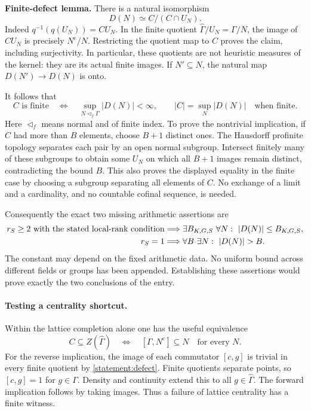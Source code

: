 \documentclass[11pt,a4paper]{article}
\numberwithin{equation}{section}
\begin{document}
\textbf{Finite-defect lemma.} There is a natural isomorphism
\begin{equation}\label{statement:defect}
 D(N)\simeq C/(C\cap U_N).
\end{equation}
Indeed $q^{-1}(q(U_N))=CU_N$.  In the finite quotient
$\widehat\Gamma/U_N=\Gamma/N$, the image of $CU_N$ is precisely
$N^{\mathrm c}/N$.  Restricting the quotient map to $C$ proves the
claim, including surjectivity.  In particular, these quotients are not
heuristic measures of the kernel: they are its actual finite images.
If $N'\subseteq N$, the natural map $D(N')\to D(N)$ is onto.

It follows that
\begin{equation}\label{statement:equivalence}
 C\text{ is finite}\quad\Longleftrightarrow\quad
 \sup_{N\triangleleft_f\Gamma}|D(N)|<\infty,
 \qquad
 |C|=\sup_N|D(N)|\quad\text{when finite}.
\end{equation}
Here $\triangleleft_f$ means normal and of finite index.  To prove the
nontrivial implication, if $C$ had more than $B$ elements, choose $B+1$
distinct ones.  The Hausdorff profinite topology separates each pair by
an open normal subgroup.  Intersect finitely many of these subgroups to
obtain some $U_N$ on which all $B+1$ images remain distinct, contradicting
the bound $B$.  This also proves the displayed equality in the finite
case by choosing a subgroup separating all elements of $C$.
No exchange of a limit and a cardinality, and no countable cofinal
sequence, is needed.

Consequently the exact two missing arithmetic assertions are
\begin{align}\label{statement:targets}
 r_S\geq2\text{ with the stated local-rank condition}
 &\Longrightarrow \exists B_{K,G,S}\ \forall N:\ |D(N)|\leq B_{K,G,S},\\
 r_S=1&\Longrightarrow \forall B\ \exists N:\ |D(N)|>B.\notag
\end{align}
The constant may depend on the fixed arithmetic data.  No uniform bound
across different fields or groups has been appended.  Establishing these
assertions would prove exactly the two conclusions of the entry.

\paragraph{Testing a centrality shortcut.}
Within the lattice completion alone one has the useful equivalence
\begin{equation}\label{statement:center}
 C\subseteq Z(\widehat\Gamma)
 \quad\Longleftrightarrow\quad
 [\Gamma,N^{\mathrm c}]\subseteq N\quad\text{for every }N.
\end{equation}
For the reverse implication, the image of each commutator $[c,g]$ is
trivial in every finite quotient by \eqref{statement:defect}.  Finite quotients
separate points, so $[c,g]=1$ for $g\in\Gamma$.  Density and continuity
extend this to all $g\in\widehat\Gamma$.  The forward implication follows
by taking images.  Thus a failure of lattice centrality has a finite
witness.
\end{document}
